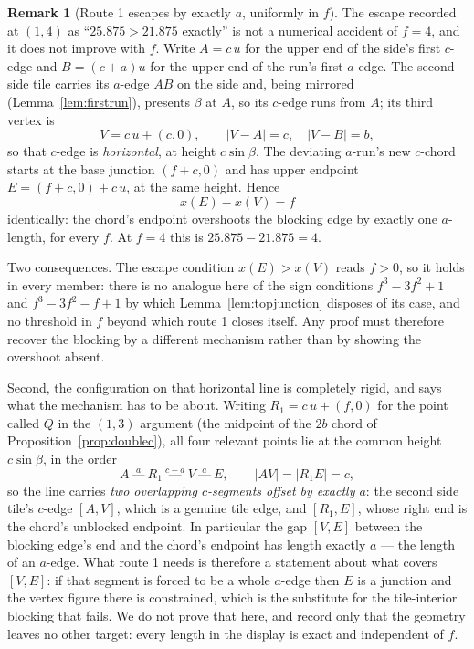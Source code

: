 \documentclass[11pt,reqno]{amsart}
\theoremstyle{plain}
\theoremstyle{definition}
\newtheorem{remark}[theorem]{Remark}
\begin{document}
\begin{remark}[Route 1 escapes by exactly $a$, uniformly in $f$]\label{rem:route1uniform}
The escape recorded at $(1,4)$ as ``$25.875>21.875$ exactly'' is not a numerical accident of $f=4$,
and it does not improve with $f$. Write $A=c\,u$ for the upper end of the side's first $c$-edge and
$B=(c+a)u$ for the upper end of the run's first $a$-edge. The second side tile carries its $a$-edge
$AB$ on the side and, being mirrored (Lemma~\ref{lem:firstrun}), presents $\beta$ at $A$, so its
$c$-edge runs from $A$; its third vertex is
\[
V=c\,u+(c,0),\qquad |V-A|=c,\quad |V-B|=b ,
\]
so that $c$-edge is \emph{horizontal}, at height $c\sin\beta$. The deviating $a$-run's new $c$-chord
starts at the base junction $(f+c,0)$ and has upper endpoint $E=(f+c,0)+c\,u$, at the same height.
Hence
\[
x(E)-x(V)=f
\]
identically: the chord's endpoint overshoots the blocking edge by exactly one $a$-length, for every
$f$. At $f=4$ this is $25.875-21.875=4$.

Two consequences. The escape condition $x(E)>x(V)$ reads $f>0$, so it holds in every member: there
is no analogue here of the sign conditions $f^3-3f^2+1$ and $f^3-3f^2-f+1$ by which
Lemma~\ref{lem:topjunction} disposes of its case, and no threshold in $f$ beyond which route 1
closes itself. Any proof must therefore recover the blocking by a different mechanism rather than by
showing the overshoot absent.

Second, the configuration on that horizontal line is completely rigid, and says what the mechanism
has to be about. Writing $R_1=c\,u+(f,0)$ for the point called $Q$ in the $(1,3)$ argument (the
midpoint of the $2b$ chord of Proposition~\ref{prop:doublec}), all four relevant points lie at the
common height $c\sin\beta$, in the order
\[
A \ \overset{a}{\text{---}}\ R_1 \ \overset{c-a}{\text{---}}\ V \ \overset{a}{\text{---}}\ E ,
\qquad |AV|=|R_1E|=c ,
\]
so the line carries \emph{two overlapping $c$-segments offset by exactly $a$}: the second side
tile's $c$-edge $[A,V]$, which is a genuine tile edge, and $[R_1,E]$, whose right end is the chord's
unblocked endpoint. In particular the gap $[V,E]$ between the blocking edge's end and the chord's
endpoint has length exactly $a$ --- the length of an $a$-edge. What route 1 needs is therefore a
statement about what covers $[V,E]$: if that segment is forced to be a whole $a$-edge then $E$ is a
junction and the vertex figure there is constrained, which is the substitute for the tile-interior
blocking that fails. We do not prove that here, and record only that the geometry leaves no other
target: every length in the display is exact and independent of $f$.
\end{remark}
\end{document}
